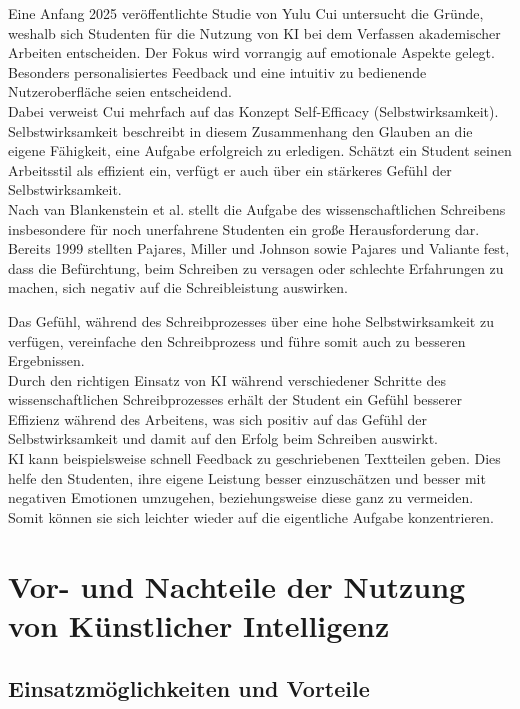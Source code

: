 \documentclass[../main.tex]{subfiles}
\begin{document}
Eine Anfang 2025 veröffentlichte Studie von Yulu Cui untersucht die Gründe, weshalb sich Studenten für die Nutzung von 
KI bei dem Verfassen akademischer Arbeiten entscheiden. Der Fokus wird vorrangig auf emotionale 
Aspekte gelegt. Besonders personalisiertes Feedback und eine intuitiv zu bedienende Nutzeroberfläche seien entscheidend.\cite{influencingUsingAi} \\
Dabei verweist Cui mehrfach auf das Konzept Self-Efficacy (Selbstwirksamkeit). Selbstwirksamkeit beschreibt in diesem Zusammenhang den Glauben 
an die eigene Fähigkeit, eine Aufgabe erfolgreich zu erledigen. Schätzt ein Student seinen Arbeitsstil als effizient ein, 
verfügt er auch über ein stärkeres Gefühl der Selbstwirksamkeit.\cite{influencingUsingAi,SelfEfficacyBeliefs}\\
Nach van Blankenstein et al. stellt die Aufgabe des wissenschaftlichen Schreibens insbesondere für noch unerfahrene Studenten 
ein große Herausforderung dar. Bereits 1999 stellten Pajares, Miller und Johnson sowie Pajares und Valiante fest,
dass die Befürchtung, beim Schreiben zu versagen oder schlechte Erfahrungen zu machen, sich negativ auf die Schreibleistung 
auswirken.\cite{writingSelfBeliefs,writingSelfBeliefsMiddleSchool}

Das Gefühl, während des Schreibprozesses über eine hohe Selbstwirksamkeit zu verfügen, vereinfache den 
Schreibprozess und führe somit auch zu besseren Ergebnissen.\cite{SelfEfficacyBeliefs} \\
Durch den richtigen Einsatz von KI während verschiedener Schritte des wissenschaftlichen Schreibprozesses erhält der Student
ein Gefühl besserer Effizienz während des Arbeitens, was sich positiv auf das Gefühl der Selbstwirksamkeit und damit auf den Erfolg
beim Schreiben auswirkt.\\
KI kann beispielsweise schnell Feedback zu geschriebenen Textteilen geben. Dies helfe den Studenten, ihre eigene 
Leistung besser einzuschätzen und besser mit negativen Emotionen umzugehen, beziehungsweise diese ganz zu vermeiden. Somit 
können sie sich leichter wieder auf die eigentliche Aufgabe konzentrieren.\cite{SelfEfficacyBeliefs} 



\section{Vor- und Nachteile der Nutzung von Künstlicher Intelligenz}

\subsection{Einsatzmöglichkeiten und Vorteile}
\end{document}
